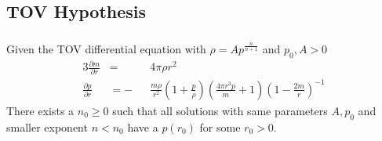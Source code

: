 \subsection{TOV Hypothesis}
\begin{frame}
	\frametitle{\insertsubsection}
	\begin{hypothesis}
		Given the TOV differential equation with $\rho=Ap^{\frac{n}{n+1}}$ and $p_0,A>0$
		\begin{alignat*}{3}
			\frac{\partial m}{\partial r} &= &&4\pi\rho r^2\\
			\frac{\partial p}{\partial r} &= -&&\frac{m\rho}{r^2}\left(1+\frac{p}{\rho}\right)\left(\frac{4\pi r^3p}{m}+1\right)\left(1-\frac{2m}{r}\right)^{-1}
		\end{alignat*}
		There exists a $n_0\geq0$ such that all solutions with same parameters $A,p_0$ and smaller exponent $n<n_0$ have a $p(r_0)$ for some $r_0>0$.
	\end{hypothesis}
\end{frame}


% 		
